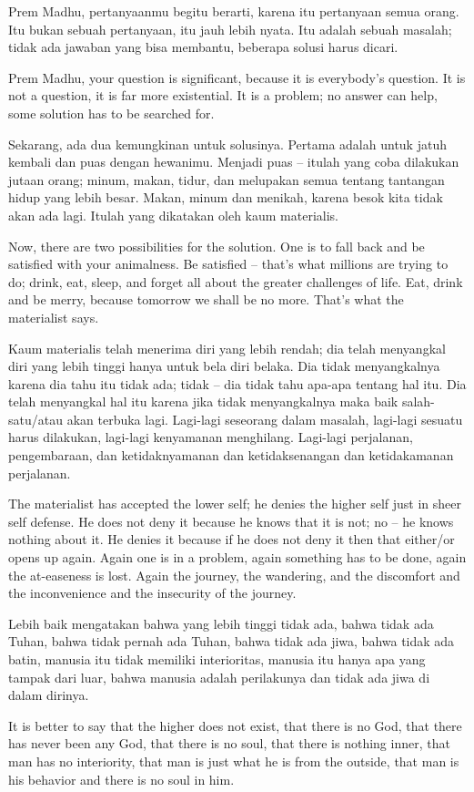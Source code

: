 \bahasa
Prem Madhu, pertanyaanmu begitu berarti, karena itu pertanyaan semua orang. Itu bukan sebuah pertanyaan, itu jauh lebih nyata. Itu adalah sebuah masalah; tidak ada jawaban yang bisa membantu, beberapa solusi harus dicari.

\english
Prem Madhu, your question is significant, because it is everybody's question. It is not a question, it is far more existential. It is a problem; no answer can help, some solution has to be searched for.

\bahasa
Sekarang, ada dua kemungkinan untuk solusinya. Pertama adalah untuk jatuh kembali dan puas dengan hewanimu. Menjadi puas -- itulah yang coba dilakukan jutaan orang; minum, makan, tidur, dan melupakan semua tentang tantangan hidup yang lebih besar. Makan, minum dan menikah, karena besok kita tidak akan ada lagi. Itulah yang dikatakan oleh kaum materialis.

\english
Now, there are two possibilities for the solution. One is to fall back and be satisfied with your animalness. Be satisfied -- that's what millions are trying to do; drink, eat, sleep, and forget all about the greater challenges of life. Eat, drink and be merry, because tomorrow we shall be no more. That's what the materialist says.

\bahasa
Kaum materialis telah menerima diri yang lebih rendah; dia telah menyangkal diri yang lebih tinggi hanya untuk bela diri belaka. Dia tidak menyangkalnya karena dia tahu itu tidak ada; tidak -- dia tidak tahu apa-apa tentang hal itu. Dia telah menyangkal hal itu karena jika tidak menyangkalnya maka baik salah-satu/atau akan terbuka lagi. Lagi-lagi seseorang dalam masalah, lagi-lagi sesuatu harus dilakukan, lagi-lagi kenyamanan menghilang. Lagi-lagi perjalanan, pengembaraan, dan ketidaknyamanan dan ketidaksenangan dan ketidakamanan perjalanan.

\english
The materialist has accepted the lower self; he denies the higher self just in sheer self defense. He does not deny it because he knows that it is not; no -- he knows nothing about it. He denies it because if he does not deny it then that either/or opens up again. Again one is in a problem, again something has to be done, again the at-easeness is lost. Again the journey, the wandering, and the discomfort and the inconvenience and the insecurity of the journey.

\bahasa
Lebih baik mengatakan bahwa yang lebih tinggi tidak ada, bahwa tidak ada Tuhan, bahwa tidak pernah ada Tuhan, bahwa tidak ada jiwa, bahwa tidak ada batin, manusia itu tidak memiliki interioritas, manusia itu hanya apa yang tampak dari luar, bahwa manusia adalah perilakunya dan tidak ada jiwa di dalam dirinya.

\english
It is better to say that the higher does not exist, that there is no God, that there has never been any God, that there is no soul, that there is nothing inner, that man has no interiority, that man is just what he is from the outside, that man is his behavior and there is no soul in him.


